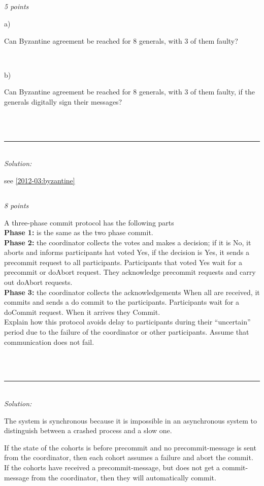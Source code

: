 \documentclass[a4paper]{article}
\newcommand{\horrule}[1]{\rule{\linewidth}{#1}} %
\newcommand{\points}[1]{\subsection{} \textit{#1 points}\\}
\newcommand{\question}[2][]{
  \noindent
  \parbox[t]{\textwidth}{#1 \parbox[t]{0.95\textwidth}{#2}}\\
}
\newcommand{\solution}[1]{\\\horrule{0.5pt}\\[3pt]\textit{Solution: }\\[0.1cm]\begin{minipage}{\textwidth}#1\end{minipage}}
\begin{document}
\points{5}
\question[a)]{
  Can Byzantine agreement be reached for 8 generals, with 3 of them
  faulty?
}
\question[b)]{
  Can Byzantine agreement be reached for 8 generals, with 3 of them
  faulty, if the generals digitally sign their messages?
}
\solution{
  see \ref{2012-03:byzantine}
}

\points{8}
\question{
  A three-phase commit protocol has the following parts \\
  \textbf{Phase 1:} is the same as the two phase commit.\\
  \textbf{Phase 2:} the coordinator collects the votes and makes a
  decision; if it is No, it aborts and informs participants hat voted
  Yes, if the decision is Yes, it sends a precommit request to all
  participants. Participants that voted Yes wait for a precommit or
  doAbort request. They acknowledge precommit requests and carry out
  doAbort requests. \\
  \textbf{Phase 3:} the coordinator collects the acknowledgements When
  all are received, it commits and sends a do commit to the
  participants. Participants wait for a doCommit request. When it
  arrives they Commit. \\
  Explain how this protocol avoids delay to participants during their
  ``uncertain'' period due to the failure of the coordinator or other
  participants. Assume that communication does not fail.
}
\solution{
  The system is synchronous because it is impossible in an
  asynchronous system to distinguish between a crashed process and a
  slow one.

  If the state of the cohorts is before precommit and no
  precommit-message is sent from the coordinator, then each cohort
  assumes a failure and abort the commit. If the cohorts have received
  a precommit-message, but does not get a commit-message from the
  coordinator, then they will automatically commit.
}
\end{document}
